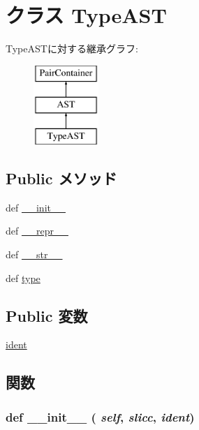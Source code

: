 \hypertarget{classslicc_1_1ast_1_1TypeAST_1_1TypeAST}{
\section{クラス TypeAST}
\label{classslicc_1_1ast_1_1TypeAST_1_1TypeAST}
}
TypeASTに対する継承グラフ:\begin{figure}[H]
\begin{center}
\leavevmode
\includegraphics[height=3cm]{classslicc_1_1ast_1_1TypeAST_1_1TypeAST}
\end{center}
\end{figure}
\subsection*{Public メソッド}
\begin{DoxyCompactItemize}
\item 
def \hyperlink{classslicc_1_1ast_1_1TypeAST_1_1TypeAST_ac775ee34451fdfa742b318538164070e}{\_\-\_\-init\_\-\_\-}
\item 
def \hyperlink{classslicc_1_1ast_1_1TypeAST_1_1TypeAST_ad8b9328939df072e4740cd9a63189744}{\_\-\_\-repr\_\-\_\-}
\item 
def \hyperlink{classslicc_1_1ast_1_1TypeAST_1_1TypeAST_aa7a4b9bc0941308e362738503137460e}{\_\-\_\-str\_\-\_\-}
\item 
def \hyperlink{classslicc_1_1ast_1_1TypeAST_1_1TypeAST_a6fd3149402a39b8fbf719937bad52a38}{type}
\end{DoxyCompactItemize}
\subsection*{Public 変数}
\begin{DoxyCompactItemize}
\item 
\hyperlink{classslicc_1_1ast_1_1TypeAST_1_1TypeAST_a2fe57e2d3d2cba9a3aeba2f629eaa78b}{ident}
\end{DoxyCompactItemize}


\subsection{関数}
\hypertarget{classslicc_1_1ast_1_1TypeAST_1_1TypeAST_ac775ee34451fdfa742b318538164070e}{
\subsubsection[{\_\-\_\-init\_\-\_\-}]{\setlength{\rightskip}{0pt plus 5cm}def \_\-\_\-init\_\-\_\- ( {\em self}, \/   {\em slicc}, \/   {\em ident})}}
\label{classslicc_1_1ast_1_1TypeAST_1_1TypeAST_ac775ee34451fdfa742b318538164070e}


